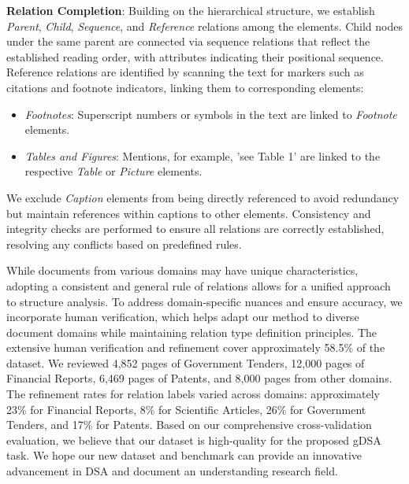 \noindent \textbf{Relation Completion}: Building on the hierarchical structure, we establish \textit{Parent}, \textit{Child}, \textit{Sequence}, and \textit{Reference} relations among the elements. Child nodes under the same parent are connected via sequence relations that reflect the established reading order, with attributes indicating their positional sequence. Reference relations are identified by scanning the text for markers such as citations and footnote indicators, linking them to corresponding elements:
\begin{itemize}
    \item \textit{Footnotes}: Superscript numbers or symbols in the text are linked to \textit{Footnote} elements.
    \item \textit{Tables and Figures}: Mentions, for example, 'see Table 1' are linked to the respective \textit{Table} or \textit{Picture} elements.
\end{itemize}

We exclude \textit{Caption} elements from being directly referenced to avoid redundancy but maintain references within captions to other elements. Consistency and integrity checks are performed to ensure all relations are correctly established, resolving any conflicts based on predefined rules. 

{While documents from various domains may have unique characteristics, adopting a consistent and general rule of relations allows for a unified approach to structure analysis. To address domain-specific nuances and ensure accuracy, we incorporate human verification, which helps adapt our method to diverse document domains while maintaining relation type definition principles. The extensive human verification and refinement cover approximately 58.5\% of the dataset. We reviewed 4,852 pages of Government Tenders, 12,000 pages of Financial Reports, 6,469 pages of Patents, and 8,000 pages from other domains. The refinement rates for relation labels varied across domains: approximately 23\% for Financial Reports, 8\% for Scientific Articles, 26\% for Government Tenders, and 17\% for Patents. Based on our comprehensive cross-validation evaluation, we believe that our dataset is high-quality for the proposed gDSA task. We hope our new dataset and benchmark can provide an innovative advancement in DSA and document an understanding research field.} 



